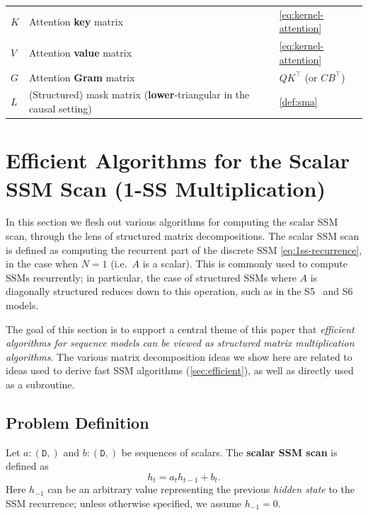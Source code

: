 \documentclass{article}
\newcommand{\citep}{\parencite}
\begin{document}
\begin{table}[!h]
\begin{tabular}{@{}lll@{}}
    $K$            & Attention \textbf{key} matrix                                              & \cref{eq:kernel-attention} \\
    $V$            & Attention \textbf{value} matrix                                            & \cref{eq:kernel-attention} \\
    $G$            & Attention \textbf{Gram} matrix                                             & $QK^{\top}$ (or $CB^{\top}$) \\
    $L$            & (Structured) mask matrix (\textbf{lower}-triangular in the causal setting) & \cref{def:sma} \\
    \bottomrule
  \end{tabular}
  \label{tab:glossary}
\end{table}

\section{Efficient Algorithms for the Scalar SSM Scan (1-SS Multiplication)}
\label{sec:scan}

In this section we flesh out various algorithms for computing the scalar SSM scan, through the lens of structured matrix decompositions.
The scalar SSM scan is defined as computing the recurrent part of the discrete SSM \eqref{eq:1ss-recurrence},
in the case when $N=1$ (i.e.\ $A$ is a scalar).
This is commonly used to compute SSMs recurrently;
in particular, the case of structured SSMs where $A$ is diagonally structured reduces down to this operation,
such as in the S5~\citep{smith2023s5} and S6~\citep{gu2023mamba} models.

The goal of this section is to support a central theme of this paper that \emph{efficient algorithms for sequence models can be viewed as structured matrix multiplication algorithms}.
The various matrix decomposition ideas we show here are related to ideas used to derive fast SSM algorithms (\cref{sec:efficient}),
as well as directly used as a subroutine.

\subsection{Problem Definition}
Let $a : \mathtt{(D,)}$ and $b : \mathtt{(D,)}$ be sequences of scalars.
The \textbf{scalar SSM scan} is defined as
\begin{equation}
  \label{eq:ssm-scan}
  h_t = a_t h_{t-1} + b_t
  .
\end{equation}
Here $h_{-1}$ can be an arbitrary value representing the previous \emph{hidden state} to the SSM recurrence;
unless otherwise specified, we assume $h_{-1} = 0$.
\end{document}
